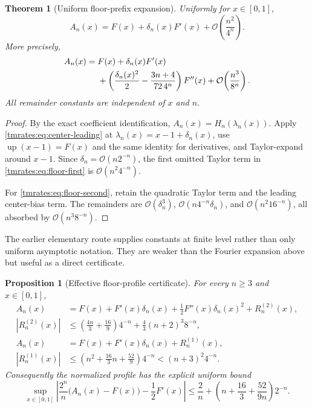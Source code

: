 \documentclass[11pt,oneside]{article}
\newtheorem{theorem}{Theorem}[section]
\newtheorem{proposition}[proposition]{Proposition}
\theoremstyle{definition}
\theoremstyle{remark}
\newcommand{\Up}{\operatorname{up}}
\newcommand{\bigO}{\mathcal O}
\begin{document}
\begin{theorem}[Uniform floor-prefix expansion]
\label{tmrates:thm:floor-expansion}
Uniformly for $x\in[0,1]$,
\begin{equation}
 A_n(x)
 =F(x)+\delta_n(x)F'(x)
  +\bigO\!\left(\frac{n^2}{4^n}\right).                  \label{tmrates:eq:floor-first}
\end{equation}
More precisely,
\begin{align}
 A_n(x)
={}&F(x)+\delta_n(x)F'(x) \notag\\
 &+\left(
    \frac{\delta_n(x)^2}{2}
    -\frac{3n+4}{72\,4^n}
   \right)F''(x)
 +\bigO\!\left(\frac{n^3}{8^n}\right).                  \label{tmrates:eq:floor-second}
\end{align}
All remainder constants are independent of $x$ and $n$.
\end{theorem}

\begin{proof}
By the exact coefficient identification,
$A_n(x)=H_n(\lambda_n(x))$.  Apply \eqref{tmrates:eq:center-leading} at
$\lambda_n(x)=x-1+\delta_n(x)$, use $\Up(x-1)=F(x)$ and the same identity for derivatives,
and Taylor-expand around $x-1$.  Since $\delta_n=\bigO(n2^{-n})$, the first omitted Taylor
term in \eqref{tmrates:eq:floor-first} is $\bigO(n^2 4^{-n})$.

For \eqref{tmrates:eq:floor-second}, retain the quadratic Taylor term and the leading center-bias
term.  The remainders are
$\bigO(\delta_n^3)$, $\bigO(n4^{-n}\delta_n)$, and
$\bigO(n^2 16^{-n})$, all absorbed by $\bigO(n^3 8^{-n})$.
\end{proof}

The earlier elementary route supplies constants at finite level rather than only uniform
asymptotic notation.  They are weaker than the Fourier expansion above but useful as a
direct certificate.

\begin{proposition}[Effective floor-profile certificate]
\label{tmrates:prop:effective-floor-certificate}
For every \(n\geq3\) and \(x\in[0,1]\),
\begin{align}
 A_n(x)&=F(x)+F'(x)\delta_n(x)+\frac12F''(x)\delta_n(x)^2
          +R^{(2)}_n(x),\label{tmrates:eq:effective-second-order}\\
 |R^{(2)}_n(x)|&\leq
 \left(\frac{4n}{3}+\frac{16}{9}\right)4^{-n}
 +\frac43(n+2)^3 8^{-n},\label{tmrates:eq:effective-second-order-remainder}\\
 A_n(x)&=F(x)+F'(x)\delta_n(x)+R^{(1)}_n(x),\label{tmrates:eq:effective-first-order}\\
 |R^{(1)}_n(x)|&\leq
 \left(n^2+\frac{16}{3}n+\frac{52}{9}\right)4^{-n}
 <(n+3)^2 4^{-n}.\label{tmrates:eq:effective-first-order-remainder}
\end{align}
Consequently the normalized profile has the explicit uniform bound
\begin{equation}
 \sup_{x\in[0,1]}
 \left|\frac{2^n}{n}\bigl(A_n(x)-F(x)\bigr)-\frac12F'(x)\right|
 \leq \frac2n+
 \left(n+\frac{16}{3}+\frac{52}{9n}\right)2^{-n}.
 \label{tmrates:eq:effective-uniform-profile-bound}
\end{equation}
\end{proposition}
\end{document}
